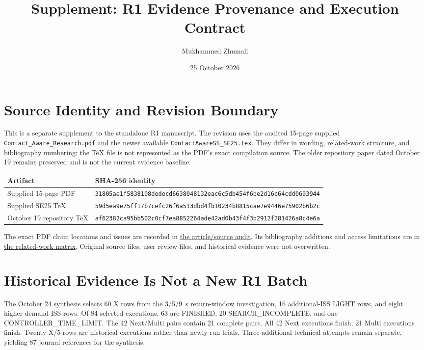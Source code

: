 \documentclass[11pt]{article}
\title{Supplement: R1 Evidence Provenance and Execution Contract}
\author{Mukhammed Zhumali}
\date{25 October 2026}
\begin{document}
\maketitle

\section{Source Identity and Revision Boundary}
This is a separate supplement to the standalone R1 manuscript. The revision uses the audited 15-page supplied \texttt{Contact\_Aware\_Research.pdf} and the newer available \texttt{ContactAwareSS\_SE25.tex}. They differ in wording, related-work structure, and bibliography numbering; the TeX file is not represented as the PDF's exact compilation source. The older repository paper dated October 19 remains preserved and is not the current evidence baseline.

\begin{longtable}{p{}p{}}
\toprule Artifact & SHA-256 identity \\
\midrule\endhead
Supplied 15-page PDF & \texttt{31805ae1f5838108dedecd6638048132ea}\newline\texttt{c6c5db454f6be2d16c64cdd0693944} \\
Supplied SE25 TeX & \texttt{59d5ea9e75ff17b7cefc26f6a513dbd4f}\newline\texttt{b10234b8815cae7e9446e75902b6b2c} \\
October 19 repository TeX & \texttt{af62382ca95bb502c0cf7ea8852264ade4}\newline\texttt{2ad0b43f4f3b2912f281426a8c4e6a} \\
\bottomrule
\end{longtable}

The exact PDF claim locations and issues are recorded in \href{../research-audit/article-sources.md}{the article/source audit}. Its bibliography additions and access limitations are in \href{../research-audit/related-work.md}{the related-work matrix}. Original source files, user review files, and historical evidence were not overwritten.

\section{Historical Evidence Is Not a New R1 Batch}
The October 24 synthesis selects 60 X rows from the 3/5/9~s return-window investigation, 16 additional-ISS LIGHT rows, and eight higher-demand ISS rows. Of 84 selected executions, 63 are FINISHED, 20 SEARCH\_INCOMPLETE, and one CONTROLLER\_TIME\_LIMIT. The 42 Next/Multi pairs contain 21 complete pairs. All 42 Next executions finish; 21 Multi executions finish. Twenty X/5 rows are historical executions rather than newly run trials. Three additional technical attempts remain separate, yielding 87 journal references for the synthesis.
\end{document}

